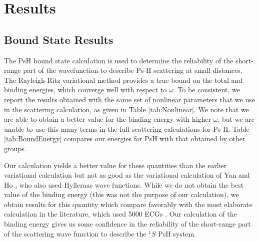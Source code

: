 \documentclass[preprint,showpacs,preprintnumbers,amsmath,amssymb,longbibliography,pra,aps]{revtex4-1}
\begin{document}
\section{Results}
\label{sec:Results}

\subsection{Bound State Results}

The PsH bound state calculation is used to determine the reliability of the short-range part of the wavefunction to describe Ps-H scattering at small distances. The Rayleigh-Ritz variational method provides a true bound on the total and binding energies, which converge well with respect to $\omega$. To be consistent, we report the results obtained with the same set of nonlinear parameters that we use in the scattering calculation, as given in Table \ref{tab:Nonlinear}. We note that we are able to obtain a better value for the binding energy with higher $\omega$, but we are unable to use this many terms in the full scattering calculations for Ps-H. Table \ref{tab:BoundEnergy} compares our energies for PsH with that obtained by other groups.

Our calculation yields a better value for these
quantities than the earlier variational calculation \cite{VanReeth2003,VanReeth2004}
but not as good as the variational calculation of
Yan and Ho \cite{Yan1999}, who also used Hylleraas wave functions.
While we do not obtain the best value of the binding energy
(this was not the purpose of our calculation),
we obtain results for this quantity which compare favorably with
the most elaborate calculation in the literature, which
used 5000 ECGs \cite{Bubin2006}.
Our calculation of the binding energy gives us some confidence
in the reliability of the short-range part of the
scattering wave function to describe
the $^1S$ PsH system.
\end{document}

